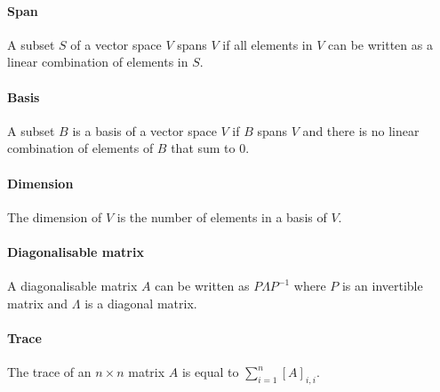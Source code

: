 \documentclass[]{article}
\begin{document}
\paragraph{Span} A subset $S$ of a vector space $V$ spans $V$ if all elements in $V$ can be written as a linear combination of elements in $S$.
\paragraph{Basis} A subset $B$ is a basis of a vector space $V$ if $B$ spans $V$ and there is no linear combination of elements of $B$ that sum to 0. 
\paragraph{Dimension} The dimension of $V$ is the number of elements in a basis of $V$. 

\paragraph{Diagonalisable matrix} A diagonalisable matrix $A$ can be written as $P \Lambda P^{-1}$ where $P$ is an invertible matrix and $\Lambda$ is a diagonal matrix.
\paragraph{Trace} The trace of an $n \times n$ matrix $A$ is equal to $\sum_{i=1}^n [A]_{i,i}$. 
\end{document}
